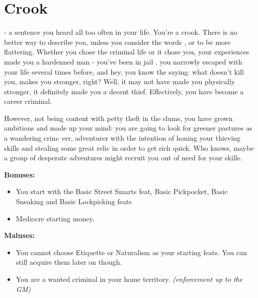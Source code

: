\section{Crook}
 - a sentence you heard all too often in your life. You're a crook. There is no better way to describe you, unless you consider the words ,  or  to be more flattering. Whether you chose the criminal life or it chose you, your experiences made you a hardenned man - you've been in jail , you narrowly escaped with your life several times before, and hey, you know the saying: what doesn't kill you, makes you stronger, right? Well, it may not have made you physically stronger, it definitely made you a decent thief. Effectively, you have become a career criminal.

However, not being content with petty theft in the slums, you have grown ambitious and made up your mind: you are going to look for greener pastures as a wandering crim- err, adventurer with the intention of honing your thieving skills and stealing some great relic in order to get rich quick. Who knows, maybe a group of desperate adventures might recruit you out of need for your skills.

\textbf{Bonuses:}
\begin{itemize}
	\item You start with the Basic Street Smarts feat, Basic Pickpocket, Basic Sneaking and Basic Lockpicking feats
	\item Mediocre starting money.
\end{itemize}


\textbf{Maluses:}
\begin{itemize}
	\item You cannot choose Etiquette or Naturalism as your starting feats. You can still acquire them later on though.
	\item You are a wanted criminal in your home territory. \textit{(enforcement up to the GM)}
\end{itemize}

